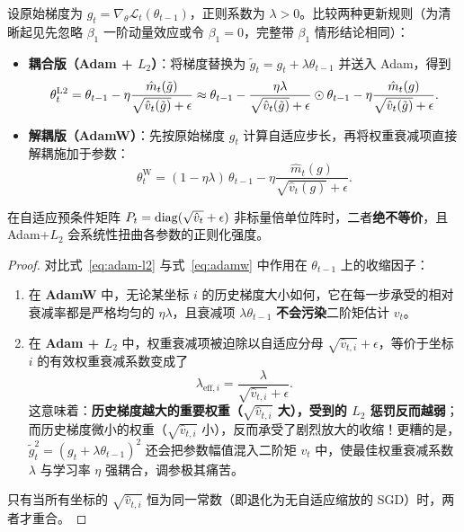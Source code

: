 \begin{thmBox}
\begin{theorem}
\label{thm:adamw}
设原始梯度为 $g_t = \nabla_\theta \mathcal{L}_t(\theta_{t-1})$，正则系数为 $\lambda > 0$。比较两种更新规则（为清晰起见先忽略 $\beta_1$ 一阶动量效应或令 $\beta_1 = 0$，完整带 $\beta_1$ 情形结论相同）：
\begin{itemize}
  \item \textbf{耦合版（Adam + $L_2$）}：将梯度替换为 $\tilde{g}_t = g_t + \lambda \theta_{t-1}$ 并送入 Adam，得到
  \begin{equation}
    \theta_t^{\text{L2}} = \theta_{t-1} - \eta \frac{\hat{m}_t(\tilde{g})}{\sqrt{\hat{v}_t(\tilde{g})} + \epsilon}
    \approx \theta_{t-1} - \frac{\eta \lambda}{\sqrt{\hat{v}_t(\tilde{g})} + \epsilon} \odot \theta_{t-1} - \eta \frac{\hat{m}_t(g)}{\sqrt{\hat{v}_t(\tilde{g})} + \epsilon}.
    \label{eq:adam-l2}
  \end{equation}
  \item \textbf{解耦版（AdamW）}：先按原始梯度 $g_t$ 计算自适应步长，再将权重衰减项直接解耦施加于参数：
  \begin{equation}
    \theta_t^{\text{W}} = (1 - \eta \lambda)\,\theta_{t-1} - \eta \frac{\hat{m}_t(g)}{\sqrt{\hat{v}_t(g)} + \epsilon}.
    \label{eq:adamw}
  \end{equation}
\end{itemize}
在自适应预条件矩阵 $P_t = \operatorname{diag}(\sqrt{\hat{v}_t} + \epsilon)$ 非标量倍单位阵时，二者\textbf{绝不等价}，且 Adam+$L_2$ 会系统性扭曲各参数的正则化强度。
\end{theorem}
\begin{proof}
对比式~\eqref{eq:adam-l2} 与式~\eqref{eq:adamw} 中作用在 $\theta_{t-1}$ 上的收缩因子：
\begin{enumerate}
  \item 在 \textbf{AdamW} 中，无论某坐标 $i$ 的历史梯度大小如何，它在每一步承受的相对衰减率都是严格均匀的 $\eta\lambda$，且衰减项 $\lambda\theta_{t-1}$ \textbf{不会污染}二阶矩估计 $v_t$。
  \item 在 \textbf{Adam + $L_2$} 中，权重衰减项被迫除以自适应分母 $\sqrt{\hat{v}_{t,i}} + \epsilon$，等价于坐标 $i$ 的有效权重衰减系数变成了
  \[
    \lambda_{\text{eff}, i} = \frac{\lambda}{\sqrt{\hat{v}_{t,i}} + \epsilon}.
  \]
  这意味着：\textbf{历史梯度越大的重要权重（$\sqrt{\hat{v}_{t,i}}$ 大），受到的 $L_2$ 惩罚反而越弱}；而历史梯度微小的权重（$\sqrt{\hat{v}_{t,i}}$ 小），反而承受了剧烈放大的收缩！更糟的是，$\tilde{g}_t^2 = (g_t + \lambda\theta_{t-1})^2$ 还会把参数幅值混入二阶矩 $v_t$ 中，使最佳权重衰减系数 $\lambda$ 与学习率 $\eta$ 强耦合，调参极其痛苦。
\end{enumerate}
只有当所有坐标的 $\sqrt{\hat{v}_{t,i}}$ 恒为同一常数（即退化为无自适应缩放的 SGD）时，两者才重合。
\end{proof}
\end{thmBox}


